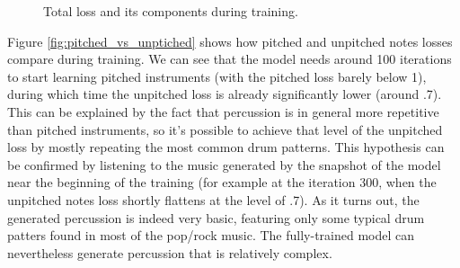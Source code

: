 \documentclass[en]{pracamgr}
\begin{document}
\begin{figure}
    \centering
    \caption{Total loss and its components during training.}
    \label{fig:total}
\end{figure}

Figure \ref{fig:pitched_vs_unptiched} shows how pitched and unpitched notes losses compare during training.
We can see that the model needs around 100 iterations to start learning pitched instruments (with the pitched loss barely below 1), during which time the unpitched loss is already significantly lower (around .7).
This can be explained by the fact that percussion is in general more repetitive than pitched instruments, so it's possible to achieve that level of the unpitched loss by mostly repeating the most common drum patterns.
This hypothesis can be confirmed by listening to the music generated by the snapshot of the model near the beginning of the training (for example at the iteration 300, when the unpitched notes loss shortly flattens at the level of .7).
As it turns out, the generated percussion is indeed very basic, featuring only some typical drum patters found in most of the pop/rock music.
The fully-trained model can nevertheless generate percussion that is relatively complex.
\end{document}
